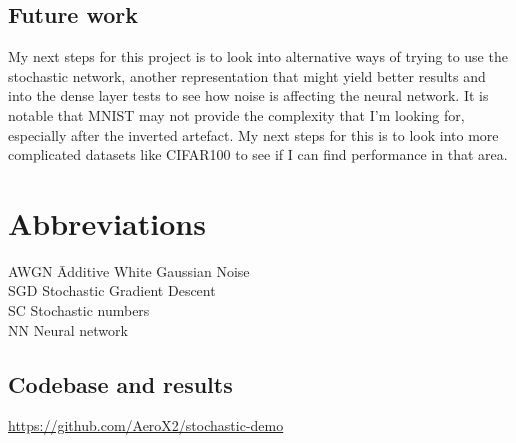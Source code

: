 \documentclass[a4paper,oneside,phd,etd]{BYUPhys}
\begin{document}
\section{Future work}
\label{sec:ConclustionsFuturework}
My next steps for this project is to look into alternative ways of trying to use the stochastic network, another representation that might yield better results and into the dense layer tests to see how noise is affecting the neural network.
It is notable that MNIST may not provide the complexity that I'm looking for, especially after the inverted artefact. My next steps for this is to look into more complicated datasets like CIFAR100 to see if I can find performance in that area.

\clearemptydoublepage
\chapter{Abbreviations}
\label{chap:abbreviations}

\begin{tabbing}

AWGN \qquad \qquad \= Additive White Gaussian Noise\\
SGD \> Stochastic Gradient Descent\\
SC \> Stochastic numbers\\
NN \> Neural network \\
\end{tabbing}


\appendix
\section{Codebase and results}
\url{https://github.com/AeroX2/stochastic-demo}

%

%

%
\end{document}
